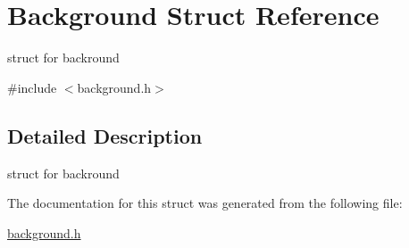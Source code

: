 \hypertarget{structBackground}{}\section{Background Struct Reference}
\label{structBackground}


struct for backround  




{\ttfamily \#include $<$background.\+h$>$}



\subsection{Detailed Description}
struct for backround 

The documentation for this struct was generated from the following file\+:\begin{DoxyCompactItemize}
\item 
\hyperlink{background_8h}{background.\+h}\end{DoxyCompactItemize}
